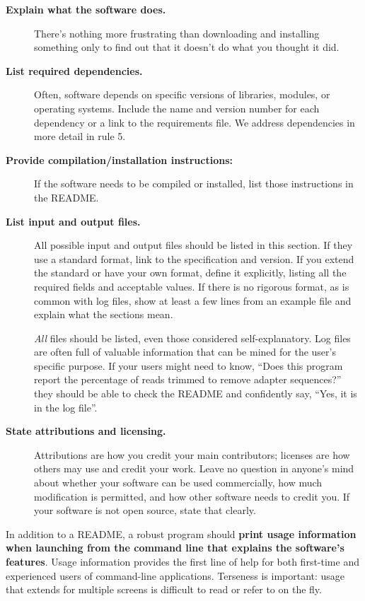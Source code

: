 \documentclass[10pt,letterpaper]{article}
\begin{document}
\begin{description}

\item[\textbf{Explain what the software does.}] 
There's nothing more frustrating
than downloading and installing something only to
find out that it doesn't do what you thought it did.

\item[\textbf{List required dependencies.}] Often, software depends on
specific versions of libraries, modules, or operating systems. Include the name and
version number for each dependency or a link to the requirements file. 
We address dependencies in more detail in rule 5.

\item[\textbf{Provide compilation/installation instructions:}]
If the software needs to be compiled
or installed, list those instructions in the README.

\item[\textbf{List input and output files.}] All possible input and output files
should be listed in this section. 
If they use a standard format, link to the specification and
version. If you extend the standard or have your own format, define it
explicitly, listing all the required fields and acceptable values.
If there is no rigorous format, as is common with log files, show at least a
few lines from an
example file and explain what the sections mean.

\emph{All} files should be listed, even those considered self-explanatory. Log
files are often full of valuable information that can be
mined for the user's specific purpose. If your users might need to know,
``Does this program report the percentage of reads trimmed to remove
adapter sequences?'' they should be able to check the README and confidently
say, ``Yes, it is in the log file''.

\item[\textbf{State attributions and licensing.}] Attributions are how you credit
your main contributors; licenses are how others may use and
credit your work.
Leave no
question in anyone's mind about whether your software can be used
commercially, how much modification is permitted, and how other software
needs to credit you. If your software is not open source, state that clearly.
\end{description}

In addition to a README, a robust program should
\textbf{print usage information when launching from the command line that explains the software's features}.
Usage information provides the first line of help for both first-time and
experienced users of command-line applications. Terseness is
important: usage that extends for multiple screens is 
difficult to read or refer to on the fly.
\end{document}
